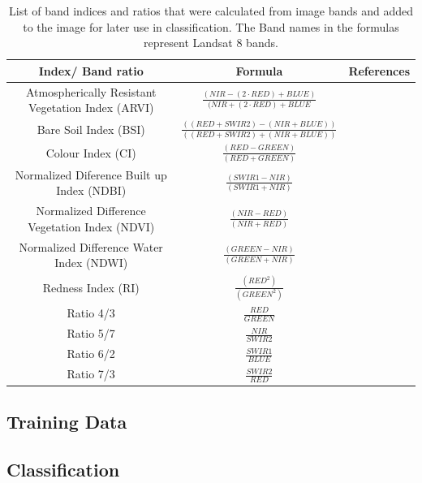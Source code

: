 \documentclass[11pt, letterpaper, oneside]{article}
\begin{document}
\begin{landscape}
\begin{table}
\caption{List of band indices and ratios that were calculated from image bands and added to the image for later use in classification. The Band names in the formulas represent Landsat 8 bands.}
\centering
\bgroup%
\def\arraystretch{2}%
\begin{tabular}{c c c}
  \hline
 Index/ Band ratio & Formula & References  \\ 
  \hline
Atmospherically Resistant Vegetation Index (ARVI) & \(\frac{(NIR-(2\cdot RED)+BLUE)}{(NIR+(2 \cdot RED)+BLUE}\) & \cite{Yuvaraj.2022}\cite{Kaufman.1992}\\
Bare Soil Index (BSI)& \(\frac{((RED+SWIR2)-(NIR+BLUE))}{((RED+SWIR2)+(NIR+BLUE))}\)& \cite{Diek.2017}\\
Colour Index (CI) & \(\frac{(RED-GREEN)}{(RED+GREEN)}\) &\cite{Yuvaraj.2022}\\
Normalized Diference Built up Index (NDBI) & \(\frac{(SWIR1-NIR)}{(SWIR1+NIR)}\) & \cite{Zha.2003}\\
Normalized Difference Vegetation Index (NDVI)& \(\frac{(NIR-RED)}{(NIR+RED)}\) &\\
Normalized Difference Water Index (NDWI)& \(\frac{(GREEN-NIR)}{(GREEN+NIR)}\) & \cite{McFEETERS.1996}\\
Redness Index (RI)& \(\frac{(RED^2)}{(GREEN^2)}\) & \cite{Yuvaraj.2022}\\
Ratio 4/3 & \(\frac{RED}{GREEN}\) & \cite{Mwaniki.2015}\\
Ratio 5/7 & \(\frac{NIR}{SWIR2}\) & \cite{NgoThi.2019}\\
Ratio 6/2 & \(\frac{SWIR1}{BLUE}\) & \cite{Mwaniki.2015}\\
Ratio 7/3 & \(\frac{SWIR2}{RED}\) & \cite{Mwaniki.2015}\\

            
   \hline
\end{tabular}
\egroup%
\label{tab:bandratios}
\end{table}
\end{landscape}

\subsection{Training Data}

\subsection{Classification}
\end{document}
